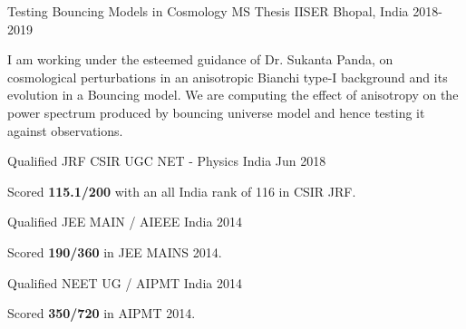 


\begin{cventries}

\cventry
{Testing Bouncing Models in Cosmology} %
{MS Thesis} %
{IISER Bhopal, India} %
{2018-2019} %
{ %
	\begin{cvitems}
		\item {I am working under the esteemed guidance of Dr. Sukanta Panda, on cosmological perturbations in an anisotropic Bianchi type-I background and its evolution in a Bouncing model. We are computing the effect of anisotropy on the power spectrum produced by bouncing universe model and hence testing it against observations.}
	\end{cvitems}
}

\cventry
{Qualified JRF} %
{CSIR UGC NET - Physics} %
{ India} %
{ Jun 2018 } %
{ %
	\begin{cvitems}
		\item {Scored \textbf{115.1/200} with an all India rank of 116 in CSIR JRF.}
	\end{cvitems}
}




\cventry
{Qualified} %
{JEE MAIN / AIEEE} %
{ India} %
{ 2014 } %
{ %
\begin{cvitems}
\item {Scored \textbf{190/360} in JEE MAINS 2014.}
\end{cvitems}
}


\cventry
{Qualified} %
{NEET UG / AIPMT} %
{ India} %
{ 2014 } %
{ %
\begin{cvitems}
\item {Scored \textbf{350/720} in AIPMT 2014.}
\end{cvitems}
}


\end{cventries}
